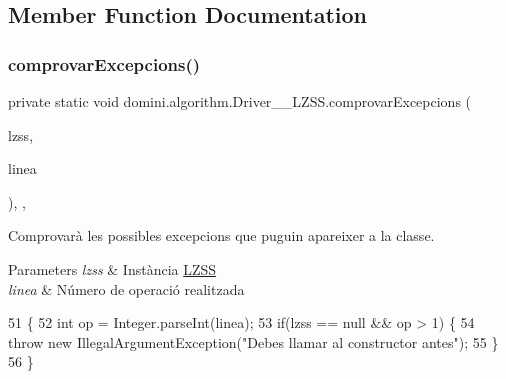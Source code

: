 \subsection{Member Function Documentation}
\mbox{\label{classdomini_1_1algorithm_1_1Driver____LZSS_a3b1983c6a71cd4d510e8434cd2e7f8f2}} 
\subsubsection{\texorpdfstring{comprovar\+Excepcions()}{comprovarExcepcions()}}
{\footnotesize\ttfamily private static void domini.\+algorithm.\+Driver\+\_\+\+\_\+\+L\+Z\+S\+S.\+comprovar\+Excepcions (\begin{DoxyParamCaption}\item[{\hyperlink{classdomini_1_1algorithm_1_1LZSS}{L\+Z\+SS}}]{lzss,  }\item[{String}]{linea }\end{DoxyParamCaption})\hspace{0.3cm}{\ttfamily [inline]}, {\ttfamily [static]}, {\ttfamily [private]}}



Comprovarà les possibles excepcions que puguin apareixer a la classe. 


\begin{DoxyParams}{Parameters}
{\em lzss} & Instància \hyperlink{classdomini_1_1algorithm_1_1LZSS}{L\+Z\+SS} \\
\hline
{\em linea} & Número de operació realitzada \\
\hline
\end{DoxyParams}

\begin{DoxyCode}
51                                                                     \{
52         \textcolor{keywordtype}{int} op = Integer.parseInt(linea);
53         \textcolor{keywordflow}{if}(lzss == null && op > 1) \{
54             \textcolor{keywordflow}{throw} \textcolor{keyword}{new} IllegalArgumentException(\textcolor{stringliteral}{"Debes llamar al constructor antes"});
55         \}
56     \}
\end{DoxyCode}
\mbox{\label{classdomini_1_1algorithm_1_1Driver____LZSS_ac1b8e15e184e7372a5ad2a76ac3b5d8c}} 
